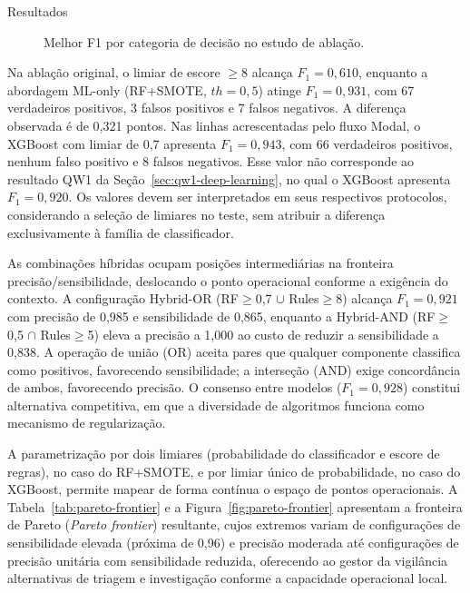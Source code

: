\begin{chapter}{Resultados}
\begin{figure}[!ht]
\centering

\caption{Melhor F1 por categoria de decisão no estudo de ablação.}
\label{fig:ablation-barplot}
\end{figure}

Na ablação original, o limiar de escore $\geq 8$ alcança $F_1 = 0{,}610$, enquanto a abordagem ML-only (RF+SMOTE, $th = 0{,}5$) atinge $F_1 = 0{,}931$, com 67 verdadeiros positivos, 3 falsos positivos e 7 falsos negativos. A diferença observada é de 0,321 pontos. Nas linhas acrescentadas pelo fluxo Modal, o XGBoost com limiar de 0,7 apresenta $F_1 = 0{,}943$, com 66 verdadeiros positivos, nenhum falso positivo e 8 falsos negativos. Esse valor não corresponde ao resultado QW1 da Seção~\ref{sec:qw1-deep-learning}, no qual o XGBoost apresenta $F_1 = 0{,}920$. Os valores devem ser interpretados em seus respectivos protocolos, considerando a seleção de limiares no teste, sem atribuir a diferença exclusivamente à família de classificador.

As combinações híbridas ocupam posições intermediárias na fronteira precisão/sensibilidade, deslocando o ponto operacional conforme a exigência do contexto. A configuração Hybrid-OR (RF$\geq$0,7 $\cup$ Rules$\geq$8) alcança $F_1 = 0{,}921$ com precisão de 0,985 e sensibilidade de 0,865, enquanto a Hybrid-AND (RF$\geq$0,5 $\cap$ Rules$\geq$5) eleva a precisão a 1,000 ao custo de reduzir a sensibilidade a 0,838. A operação de união (OR) aceita pares que qualquer componente classifica como positivos, favorecendo sensibilidade; a interseção (AND) exige concordância de ambos, favorecendo precisão. O consenso entre modelos ($F_1 = 0{,}928$) constitui alternativa competitiva, em que a diversidade de algoritmos funciona como mecanismo de regularização.

A parametrização por dois limiares (probabilidade do classificador e escore de regras), no caso do RF+SMOTE, e por limiar único de probabilidade, no caso do XGBoost, permite mapear de forma contínua o espaço de pontos operacionais. A Tabela~\ref{tab:pareto-frontier} e a Figura~\ref{fig:pareto-frontier} apresentam a fronteira de Pareto (\textit{Pareto frontier}) resultante, cujos extremos variam de configurações de sensibilidade elevada (próxima de 0,96) e precisão moderada até configurações de precisão unitária com sensibilidade reduzida, oferecendo ao gestor da vigilância alternativas de triagem e investigação conforme a capacidade operacional local.




\end{chapter}
